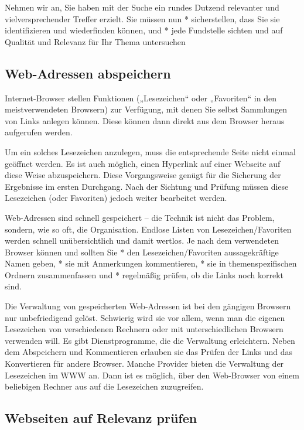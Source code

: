 \documentclass[]{book}
\theoremstyle{definition}
\theoremstyle{definition}
\theoremstyle{definition}
\theoremstyle{remark}
\begin{document}
Nehmen wir an, Sie haben mit der Suche ein rundes Dutzend relevanter und
vielversprechender Treffer erzielt. Sie müssen nun * sicherstellen, dass
Sie sie identifizieren und wiederfinden können, und * jede Fundstelle
sichten und auf Qualität und Relevanz für Ihr Thema untersuchen

\subsection{Web-Adressen abspeichern}\label{web-adressen-abspeichern}

Internet-Browser stellen Funktionen („Lesezeichen`` oder „Favoriten`` in
den meistverwendeten Browsern) zur Verfügung, mit denen Sie selbst
Sammlungen von Links anlegen können. Diese können dann direkt aus dem
Browser heraus aufgerufen werden.

Um ein solches Lesezeichen anzulegen, muss die entsprechende Seite nicht
einmal geöffnet werden. Es ist auch möglich, einen Hyperlink auf einer
Webseite auf diese Weise abzuspeichern. Diese Vorgangsweise genügt für
die Sicherung der Ergebnisse im ersten Durchgang. Nach der Sichtung und
Prüfung müssen diese Lesezeichen (oder Favoriten) jedoch weiter
bearbeitet werden.

Web-Adressen sind schnell gespeichert -- die Technik ist nicht das
Problem, sondern, wie so oft, die Organisation. Endlose Listen von
Lesezeichen/Favoriten werden schnell unübersichtlich und damit wertlos.
Je nach dem verwendeten Browser können und sollten Sie * den
Lesezeichen/Favoriten aussagekräftige Namen geben, * sie mit Anmerkungen
kommentieren, * sie in themenspezifischen Ordnern zusammenfassen und *
regelmäßig prüfen, ob die Links noch korrekt sind.

Die Verwaltung von gespeicherten Web-Adressen ist bei den gängigen
Browsern nur unbefriedigend gelöst. Schwierig wird sie vor allem, wenn
man die eigenen Lesezeichen von verschiedenen Rechnern oder mit
unterschiedlichen Browsern verwenden will. Es gibt Dienstprogramme, die
die Verwaltung erleichtern. Neben dem Abspeichern und Kommentieren
erlauben sie das Prüfen der Links und das Konvertieren für andere
Browser. Manche Provider bieten die Verwaltung der Lesezeichen im WWW
an. Dann ist es möglich, über den Web-Browser von einem beliebigen
Rechner aus auf die Lesezeichen zuzugreifen.

\subsection{Webseiten auf Relevanz
prüfen}\label{webseiten-auf-relevanz-prufen}
\end{document}
